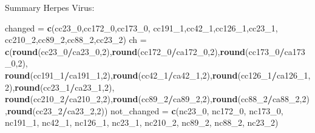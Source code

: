 \documentclass[
]{article}
\newenvironment{Shaded}{\begin{snugshade}}{\end{snugshade}}
\newcommand{\DecValTok}[1]{\textcolor[rgb]{0.00,0.00,0.81}{#1}}
\newcommand{\KeywordTok}[1]{\textcolor[rgb]{0.13,0.29,0.53}{\textbf{#1}}}
\newcommand{\NormalTok}[1]{#1}
\newcommand{\OperatorTok}[1]{\textcolor[rgb]{0.81,0.36,0.00}{\textbf{#1}}}
\newcommand{\StringTok}[1]{\textcolor[rgb]{0.31,0.60,0.02}{#1}}
\begin{document}
Summary Herpes Virus:

\begin{Shaded}
\begin{Highlighting}[]
\NormalTok{changed =}\StringTok{ }\KeywordTok{c}\NormalTok{(cc23_}\DecValTok{0}\NormalTok{,cc172_}\DecValTok{0}\NormalTok{,cc173_}\DecValTok{0}\NormalTok{,}
\NormalTok{            cc191_}\DecValTok{1}\NormalTok{,cc42_}\DecValTok{1}\NormalTok{,cc126_}\DecValTok{1}\NormalTok{,cc23_}\DecValTok{1}\NormalTok{,}
\NormalTok{            cc210_}\DecValTok{2}\NormalTok{,cc89_}\DecValTok{2}\NormalTok{,cc88_}\DecValTok{2}\NormalTok{,cc23_}\DecValTok{2}\NormalTok{)}
\NormalTok{ch =}\StringTok{ }\KeywordTok{c}\NormalTok{(}\KeywordTok{round}\NormalTok{(cc23_}\DecValTok{0}\OperatorTok{/}\NormalTok{ca23_}\DecValTok{0}\NormalTok{,}\DecValTok{2}\NormalTok{),}\KeywordTok{round}\NormalTok{(cc172_}\DecValTok{0}\OperatorTok{/}\NormalTok{ca172_}\DecValTok{0}\NormalTok{,}\DecValTok{2}\NormalTok{),}\KeywordTok{round}\NormalTok{(cc173_}\DecValTok{0}\OperatorTok{/}\NormalTok{ca173_}\DecValTok{0}\NormalTok{,}\DecValTok{2}\NormalTok{),}
       \KeywordTok{round}\NormalTok{(cc191_}\DecValTok{1}\OperatorTok{/}\NormalTok{ca191_}\DecValTok{1}\NormalTok{,}\DecValTok{2}\NormalTok{),}\KeywordTok{round}\NormalTok{(cc42_}\DecValTok{1}\OperatorTok{/}\NormalTok{ca42_}\DecValTok{1}\NormalTok{,}\DecValTok{2}\NormalTok{),}\KeywordTok{round}\NormalTok{(cc126_}\DecValTok{1}\OperatorTok{/}\NormalTok{ca126_}\DecValTok{1}\NormalTok{,}\DecValTok{2}\NormalTok{),}\KeywordTok{round}\NormalTok{(cc23_}\DecValTok{1}\OperatorTok{/}\NormalTok{ca23_}\DecValTok{1}\NormalTok{,}\DecValTok{2}\NormalTok{),}
       \KeywordTok{round}\NormalTok{(cc210_}\DecValTok{2}\OperatorTok{/}\NormalTok{ca210_}\DecValTok{2}\NormalTok{,}\DecValTok{2}\NormalTok{),}\KeywordTok{round}\NormalTok{(cc89_}\DecValTok{2}\OperatorTok{/}\NormalTok{ca89_}\DecValTok{2}\NormalTok{,}\DecValTok{2}\NormalTok{),}\KeywordTok{round}\NormalTok{(cc88_}\DecValTok{2}\OperatorTok{/}\NormalTok{ca88_}\DecValTok{2}\NormalTok{,}\DecValTok{2}\NormalTok{),}\KeywordTok{round}\NormalTok{(cc23_}\DecValTok{2}\OperatorTok{/}\NormalTok{ca23_}\DecValTok{2}\NormalTok{,}\DecValTok{2}\NormalTok{))}
\NormalTok{not_changed =}\StringTok{ }\KeywordTok{c}\NormalTok{(nc23_}\DecValTok{0}\NormalTok{, nc172_}\DecValTok{0}\NormalTok{, nc173_}\DecValTok{0}\NormalTok{,}
\NormalTok{                nc191_}\DecValTok{1}\NormalTok{, nc42_}\DecValTok{1}\NormalTok{, nc126_}\DecValTok{1}\NormalTok{, nc23_}\DecValTok{1}\NormalTok{,}
\NormalTok{                nc210_}\DecValTok{2}\NormalTok{, nc89_}\DecValTok{2}\NormalTok{, nc88_}\DecValTok{2}\NormalTok{, nc23_}\DecValTok{2}\NormalTok{)}

\end{Highlighting}
\end{Shaded}
\end{document}
